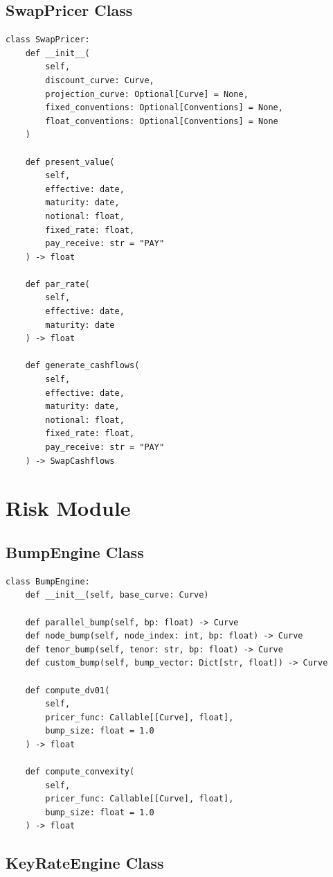 \documentclass[12pt,a4paper]{report}
\begin{document}
\subsection{SwapPricer Class}

\begin{lstlisting}
class SwapPricer:
    def __init__(
        self,
        discount_curve: Curve,
        projection_curve: Optional[Curve] = None,
        fixed_conventions: Optional[Conventions] = None,
        float_conventions: Optional[Conventions] = None
    )
    
    def present_value(
        self,
        effective: date,
        maturity: date,
        notional: float,
        fixed_rate: float,
        pay_receive: str = "PAY"
    ) -> float
    
    def par_rate(
        self,
        effective: date,
        maturity: date
    ) -> float
    
    def generate_cashflows(
        self,
        effective: date,
        maturity: date,
        notional: float,
        fixed_rate: float,
        pay_receive: str = "PAY"
    ) -> SwapCashflows
\end{lstlisting}

\section{Risk Module}

\subsection{BumpEngine Class}

\begin{lstlisting}
class BumpEngine:
    def __init__(self, base_curve: Curve)
    
    def parallel_bump(self, bp: float) -> Curve
    def node_bump(self, node_index: int, bp: float) -> Curve
    def tenor_bump(self, tenor: str, bp: float) -> Curve
    def custom_bump(self, bump_vector: Dict[str, float]) -> Curve
    
    def compute_dv01(
        self,
        pricer_func: Callable[[Curve], float],
        bump_size: float = 1.0
    ) -> float
    
    def compute_convexity(
        self,
        pricer_func: Callable[[Curve], float],
        bump_size: float = 1.0
    ) -> float
\end{lstlisting}

\subsection{KeyRateEngine Class}
\end{document}
